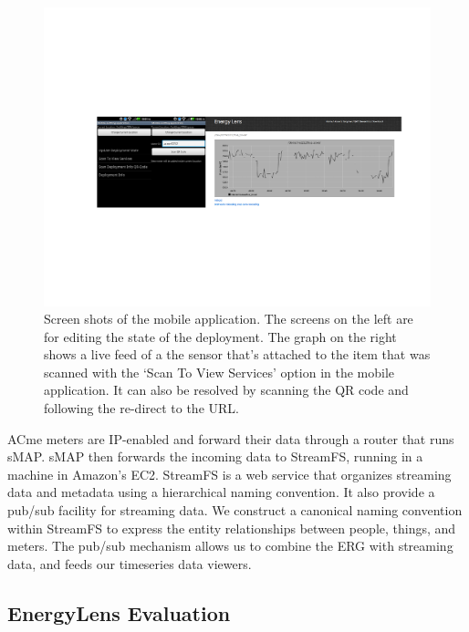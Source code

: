 \begin{figure}[htb!]
\begin{center}
\includegraphics[width=\textwidth]{figs/mobileapp}
\caption{Screen shots of the mobile application.  The screens on the left are for editing the state of the deployment.
The graph on the right shows a live feed of a the sensor that's attached to the item that was scanned with the `Scan To
View Services' option in the mobile application.  It can also be resolved by scanning the QR code and following the re-direct
to the URL.}
\label{fig:mobileapp}
\end{center}
\end{figure}

ACme meters are IP-enabled and forward their data through a router that runs sMAP.  sMAP then forwards the incoming data
to StreamFS, running in a machine in Amazon's EC2.  StreamFS is a web service that organizes streaming data and metadata using
a hierarchical naming convention.  It also provide a pub/sub facility for streaming data.  We construct 
a canonical naming convention within StreamFS to express the entity relationships between people, things, and meters.  The pub/sub
mechanism allows us to combine the ERG with streaming data, and feeds our timeseries data viewers.













\subsection{EnergyLens Evaluation}
\label{sec:eval}



